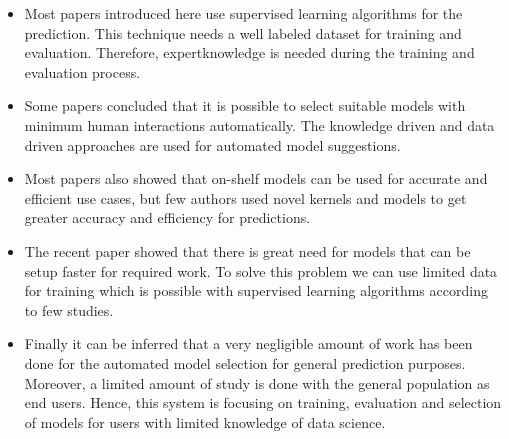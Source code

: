 \begin{itemize}
  \item Most papers introduced here use supervised learning algorithms for the prediction. This technique needs a well labeled dataset for training and evaluation. Therefore, expertknowledge is needed during the training and evaluation process.
  \item Some papers concluded that it is possible to select suitable models with minimum human interactions automatically. The knowledge driven and data driven approaches are used for automated model suggestions.
  \item Most papers also showed that on-shelf models can be used for accurate and efficient use cases, but few authors used novel kernels and models to get greater accuracy and efficiency for predictions.
  \item The recent paper showed that there is great need for models that can be setup faster for required work. To solve this problem we can use limited data for training which is possible with supervised learning algorithms according to few studies.
  \item Finally it can be inferred that a very negligible amount of work has been done for the automated model selection for general prediction purposes. Moreover, a limited amount of study is done with the general population as end users. Hence, this system is focusing on training, evaluation and selection of models for users with limited knowledge of data science.
\end{itemize}
